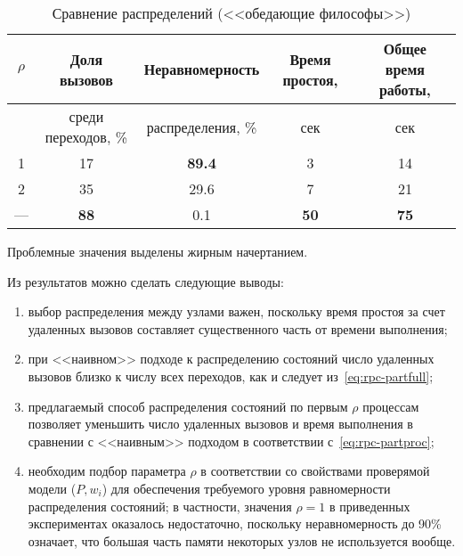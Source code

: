\documentclass[12pt,a4paper,fleqn]{article}
\begin{document}
\begin{table}[htb]
  \centering
  \begin{tabular}{|c|c|c|c|c|}
    \hline
    $\rho$ & Доля вызовов        & Неравномерность   & Время простоя, & Общее время работы, \\ \hline
           & среди переходов, \% & распределения, \% & сек            & сек                 \\ \hline
    1      & 17                  & \textbf{89.4}     & 3              & 14                  \\ \hline
    2      & 35                  & 29.6              & 7              & 21                  \\ \hline
    ---    & \textbf{88}         & 0.1               & \textbf{50}    & \textbf{75}         \\ \hline    
  \end{tabular}
  \caption{Сравнение распределений (<<обедающие философы>>)}
  \label{tab:philo-results}
\end{table}

Проблемные значения выделены жирным начертанием. 

Из результатов можно сделать следующие выводы:

\begin{enumerate}
\item выбор распределения между узлами важен, поскольку время простоя за счет удаленных вызовов составляет существенного
  часть от времени выполнения;

\item при <<наивном>> подходе к распределению состояний число удаленных вызовов близко к числу всех переходов, как и следует
  из~\eqref{eq:rpc-partfull};

\item предлагаемый способ распределения состояний по первым $\rho$ процессам позволяет уменьшить число удаленных вызовов
  и время выполнения в сравнении с <<наивным>> подходом в соответствии с~\eqref{eq:rpc-partproc};

\item необходим подбор параметра $\rho$ в соответствии со свойствами проверямой модели ($P, w_i$) для обеспечения
  требуемого уровня равномерности распределения состояний; в частности, значения $\rho = 1$ в приведенных экспериментах
  оказалось недостаточно, поскольку неравномерность до 90\% означает, что большая часть памяти некоторых узлов не
  используется вообще.
\end{enumerate}
\end{document}

